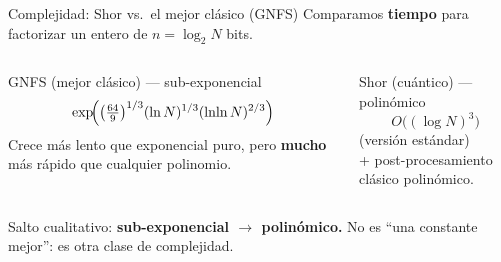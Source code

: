 \documentclass[aspectratio=169]{beamer}
\begin{document}
\begin{frame}{Complejidad: Shor vs.\ el mejor clásico (GNFS)}
  Comparamos \textbf{tiempo} para factorizar un entero de $n=\log_2 N$ bits.

  \begin{columns}[T]
    \begin{block}{GNFS (mejor clásico) — sub-exponencial}
      \small
      \[
        \exp\!\Bigl(\bigl(\tfrac{64}{9}\bigr)^{1/3}
          (\ln N)^{1/3}(\ln\!\ln N)^{2/3}\Bigr)
      \]
      Crece más lento que exponencial puro, pero \textbf{mucho} más rápido
      que cualquier polinomio.
    \end{block}

    \begin{exampleblock}{Shor (cuántico) — polinómico}
      \small
      \[
        O\!\bigl((\log N)^3\bigr)
      \]
      (versión estándar)\\[3pt]
      + post-procesamiento clásico polinómico.
    \end{exampleblock}
  \end{columns}

  \begin{alertblock}{}
    \small Salto cualitativo: \textbf{sub-exponencial $\to$ polinómico.}
    No es ``una constante mejor'': es otra clase de complejidad.
  \end{alertblock}

\end{frame}
\end{document}
